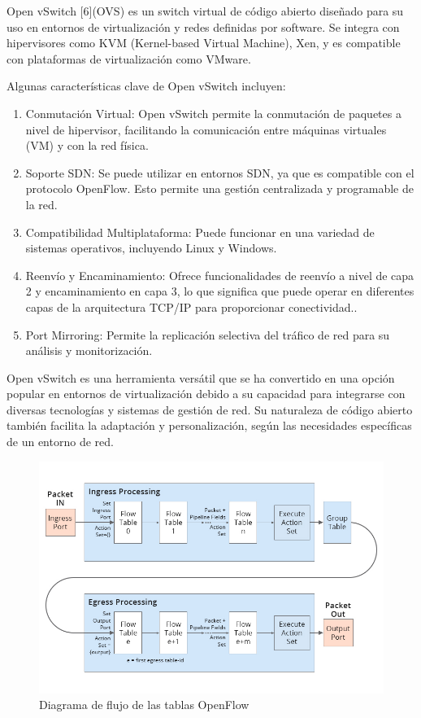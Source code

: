 \documentclass[a4paper, 12pt]{book}
\begin{document}
	Open vSwitch [6](OVS) es un switch virtual de código abierto diseñado para su uso en entornos de virtualización y redes definidas por software. Se integra con hipervisores como KVM (Kernel-based Virtual Machine), Xen, y es compatible con plataformas de virtualización como VMware.
	
	Algunas características clave de Open vSwitch incluyen:
	
	\begin{enumerate}
		\item Conmutación Virtual: Open vSwitch permite la conmutación de paquetes a nivel de hipervisor, facilitando la comunicación entre máquinas virtuales (VM) y con la red física.
		
		
		\item Soporte SDN: Se puede utilizar en entornos SDN, ya que es compatible con el protocolo OpenFlow. Esto permite una gestión centralizada y programable de la red.
		
		\item Compatibilidad Multiplataforma: Puede funcionar en una variedad de sistemas operativos, incluyendo Linux y Windows.
		
		\item Reenvío y Encaminamiento: Ofrece funcionalidades de reenvío a nivel de capa 2 y encaminamiento en capa 3, lo que significa que puede operar en diferentes capas de la arquitectura TCP/IP para proporcionar conectividad..
		
		\item Port Mirroring: Permite la replicación selectiva del tráfico de red para su análisis y monitorización.
		
	\end{enumerate}
	
	Open vSwitch es una herramienta versátil que se ha convertido en una opción popular en entornos de virtualización debido a su capacidad para integrarse con diversas tecnologías y sistemas de gestión de red. Su naturaleza de código abierto también facilita la adaptación y personalización, según las necesidades específicas de un entorno de red.
	
	\begin{figure}[H]
		\centering
		\includegraphics[width=16cm, keepaspectratio]{img/DiagramaOpenFlow}
		\caption{Diagrama de flujo de las tablas OpenFlow}
		\label{figura:DiagramaOpenFlow}
	\end{figure}
	
\end{document}
